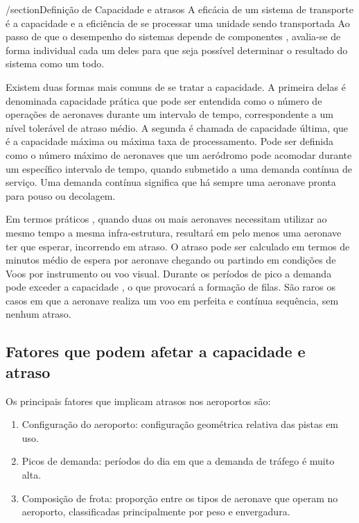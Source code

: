 \documentclass[12pt]{article}
\begin{document}
/section{Definição de Capacidade e atrasos}
A eficácia de um sistema de transporte é a capacidade e a eficiência de
se processar uma unidade sendo transportada Ao passo de que o desempenho
do sistemas depende de componentes , avalia-se de forma individual cada
um deles para que seja possível determinar o resultado do sistema como 
um todo. 

Existem duas formas mais comuns de se tratar a capacidade. A primeira delas
é denominada capacidade prática que pode ser entendida como o número de 
operações de aeronaves durante um intervalo de tempo, correspondente a um
nível tolerável de atraso médio. A segunda é chamada de capacidade última,
que é a capacidade máxima ou máxima taxa de processamento. Pode ser 
definida como o número máximo de aeronaves que um aeródromo pode acomodar
durante um específico intervalo de tempo, quando submetido a uma demanda
contínua de serviço. Uma demanda contínua significa que há sempre uma 
aeronave pronta para pouso ou decolagem. 

Em termos práticos , quando duas ou mais aeronaves necessitam utilizar ao
mesmo tempo a mesma infra-estrutura, resultará em pelo menos uma aeronave 
ter que esperar, incorrendo em atraso. O atraso pode ser calculado em termos
de minutos médio de espera por aeronave chegando ou partindo em condições 
de Voos por instrumento ou voo visual. Durante os períodos de pico a demanda
pode exceder a capacidade , o que provocará a formação de filas. São raros
os casos em que a aeronave realiza um voo em perfeita e contínua sequência,
sem nenhum atraso. 

\subsection{Fatores que podem afetar a capacidade e atraso}

Os principais fatores que implicam atrasos nos aeroportos são:


\begin{enumerate}
  
  \item Configuração do aeroporto: configuração geométrica relativa das pistas 
    em uso.

  \item Picos de demanda: períodos do dia em que a demanda de tráfego é muito
    alta.

  \item Composição de frota: proporção entre os tipos de aeronave que operam no 
  aeroporto, classificadas principalmente por peso e envergadura.

\end{enumerate}
\end{document}
